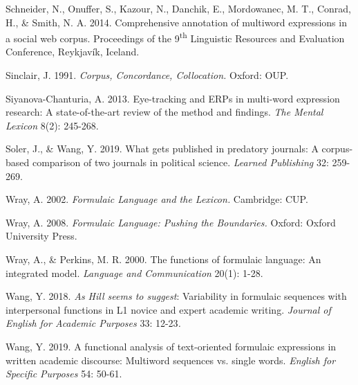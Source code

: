 \begin{styleStandard}
Schneider, N., Onuffer, S., Kazour, N., Danchik, E., Mordowanec, M. T., Conrad, H., \& Smith, N. A. 2014. Comprehensive annotation of multiword expressions in a social web corpus. Proceedings of the 9\textsuperscript{th} Linguistic Resources and Evaluation Conference, Reykjavík, Iceland. 
\end{styleStandard}

\begin{styleStandard}
Sinclair, J. 1991. \textit{Corpus, Concordance, Collocation. }Oxford: OUP.
\end{styleStandard}

\begin{styleStandard}
Siyanova-Chanturia, A. 2013. Eye-tracking and ERPs in multi-word expression research: A state-of-the-art review of the method and findings. \textit{The Mental Lexicon }8(2): 245-268.
\end{styleStandard}

\begin{styleStandard}
Soler, J.,\textbf{ }\&\textbf{ }Wang,\textbf{ }Y. 2019. What gets published in predatory journals: A corpus-based comparison of two journals in political science. \textit{Learned Publishing }32: 259-269.
\end{styleStandard}

\begin{styleStandard}
Wray, A. 2002. \textit{Formulaic Language and the Lexicon. }Cambridge: CUP.
\end{styleStandard}

\begin{styleStandard}
Wray, A. 2008. \textit{Formulaic Language: Pushing the Boundaries. }Oxford: Oxford University Press.
\end{styleStandard}

\begin{styleStandard}
Wray, A., \& Perkins, M. R. 2000. The functions of formulaic language: An integrated model. \textit{Language and Communication }20(1): 1-28.
\end{styleStandard}

\begin{styleStandard}
Wang, Y. 2018. \textit{As Hill seems to suggest}: Variability in formulaic sequences with interpersonal functions in L1 novice and expert academic writing. \textit{Journal of English for Academic Purposes }33: 12-23\textit{.}
\end{styleStandard}

\begin{styleStandard}
Wang, Y. 2019. A functional analysis of text-oriented formulaic expressions in written academic discourse: Multiword sequences vs. single words. \textit{English for Specific Purposes }54: 50-61.
\end{styleStandard}

